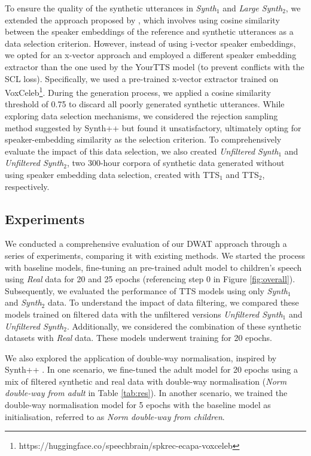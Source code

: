 To ensure the quality of the synthetic utterances in \textit{Synth$_1$} and \textit{Large Synth$_2$}, we extended the approach proposed by \cite{wang2021towards}, which involves using cosine similarity between the speaker embeddings of the reference and synthetic utterances as a data selection criterion. However, instead of using i-vector speaker embeddings, we opted for an x-vector approach and employed a different speaker embedding extractor than the one used by the YourTTS model (to prevent conflicts with the \ac{SCL} loss). Specifically, we used a pre-trained x-vector extractor trained on VoxCeleb\footnote{https://huggingface.co/speechbrain/spkrec-ecapa-voxceleb}. During the generation process, we applied a cosine similarity threshold of 0.75 to discard all poorly generated synthetic utterances. While exploring data selection mechanisms, we considered the rejection sampling method suggested by Synth++ \cite{hu2022synt++} but found it unsatisfactory, ultimately opting for speaker-embedding similarity as the selection criterion. To comprehensively evaluate the impact of this data selection, we also created \textit{Unfiltered Synth$_1$} and \textit{Unfiltered Synth$_2$}, two 300-hour corpora of synthetic data generated without using speaker embedding data selection, created with TTS$_1$ and TTS$_2$, respectively.

\subsection{Experiments}
We conducted a comprehensive evaluation of our \ac{DWAT} approach through a series of experiments, comparing it with existing methods. We started the process with baseline models, fine-tuning an pre-trained adult model to children's speech using \textit{Real} data for 20 and 25 epochs (referencing step 0 in Figure \ref{fig:overall}). Subsequently, we evaluated the performance of \ac{TTS} models using only \textit{Synth$_1$} and \textit{Synth$_2$} data. To understand the impact of data filtering, we compared these models trained on filtered data with the unfiltered versions \textit{Unfiltered Synth$_1$} and \textit{Unfiltered Synth$_2$}. Additionally, we considered the combination of these synthetic datasets with \textit{Real} data. These models underwent training for 20 epochs.

We also explored the application of double-way normalisation, inspired by Synth++ \cite{hu2022synt++}. In one scenario, we fine-tuned the adult model for 20 epochs using a mix of filtered synthetic and real data with double-way normalisation (\textit{Norm double-way from adult} in Table \ref{tab:res}). In another scenario, we trained the double-way normalisation model for 5 epochs with the baseline model as initialisation, referred to as \textit{Norm double-way from children}.

